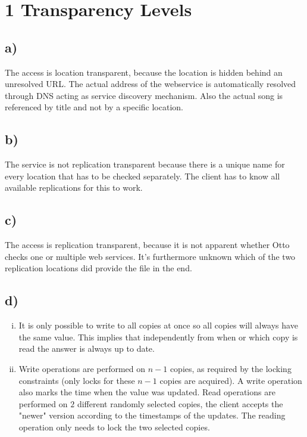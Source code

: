 \documentclass{scrartcl}
\author{Felix Bühler\\2973410 \and Clemens Lieb\\3130838 \and Steffen Wonner\\2862123 \and Fabian Bühler\\2953320}
\title{\gettitle}
\subtitle{\getsubtitle}
\begin{document}
\maketitle

\section*{1 Transparency Levels}
\subsection*{a)}
The access is location transparent, because the location is hidden behind an unresolved URL.
The actual address of the webservice is automatically resolved through DNS acting as service discovery mechanism.
Also the actual song is referenced by title and not by a specific location.
\subsection*{b)}
The service is not replication transparent because there is a unique name for every location that has to be checked separately.
The client has to know all available replications for this to work.
\subsection*{c)}
The access is replication transparent, because it is not apparent whether Otto checks one or multiple web services.
It's furthermore unknown which of the two replication locations did provide the file in the end.
\subsection*{d)}
\begin{enumerate}[i.]
	\item It is only possible to write to all copies at once so all copies will always have the same value.
		This implies that independently from when or which copy is read the answer is always up to date.
	\item Write operations are performed on \(n-1\) copies, as required by the locking constraints (only locks for these \(n-1\) copies are acquired).
		A write operation also marks the time when the value was updated.
		Read operations are performed on \(2\) different randomly selected copies, the client accepts the "newer" version according to the timestamps of the updates.
		The reading operation only needs to lock the two selected copies.
\end{enumerate}
\end{document}
